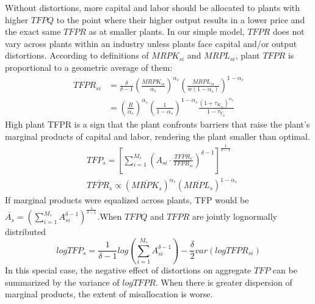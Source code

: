 \documentclass{article}
\begin{document}
Without distortions, more capital and labor should be allocated to plants with higher $TFPQ$ to the point where their higher output results in a lower price and the exact same $TFPR$ as at smaller plants. In our simple model, $TFPR$ does not vary across plants within an industry unless plants face capital and/or output distortions. According to definitions of $MRPK_{si}$ and $MRPL_{si}$, plant $TFPR$ is proportional to a geometric average of them:
\begin{align*}
    TFPR_{si}&=\frac{\delta}{\delta-1} (\frac{MRPK_{si}}{\alpha_s})^{\alpha_s} (\frac{MRPL_{si}}{w(1-\alpha_s)})^{1-\alpha_s}\\
    &=(\frac{R}{\alpha_s})^{\alpha_s} (\frac{1}{1-\alpha_s})^{1-\alpha_s} \frac{(1+\tau_{K_{si}})^{\alpha_s}}{1-\tau_{Y_{si}}}
\end{align*}
High plant TFPR is a sign that the plant confronts barriers that raise the plant’s marginal products of capital and labor, rendering the plant smaller than optimal.
\begin{align*}
    &TFP_s=[\sum_{i=1}^{M_s} (A_{si} \cdot \frac{\overline{TFPR_s}}{TFPR_{si}})^{\delta-1}]^{\frac{1}{\delta-1}}\\
    &\overline{TFPR_s} \propto (\overline{MRPK_s})^{\alpha_s}(\overline{MRPL_s})^{1-\alpha_s}
\end{align*}
If marginal products were equalized across plants, TFP would be $\overline{A_s}=(\sum_{i=1}^{M_s} A_{si}^{\delta-1})^{\frac{1}{\delta-1}}$.When $TFPQ$ and $TFPR$ are jointly lognormally distributed
\begin{equation*}
    logTFP_s=\frac{1}{\delta-1} log(\sum_{i=1}^{M_s} A_{si}^{\delta-1})-\frac{\delta}{2}var(logTFPR_{si})
\end{equation*}
In this special case, the negative effect of distortions on aggregate $TFP$ can be summarized by the variance of $log TFPR$. When there is greater dispersion of marginal products, the extent of misallocation is worse.
\end{document}
